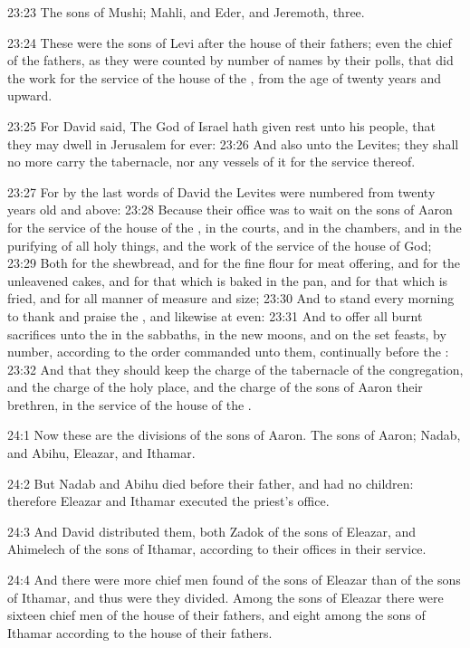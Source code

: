 23:23 The sons of Mushi; Mahli, and Eder, and Jeremoth, three.

23:24 These were the sons of Levi after the house of their fathers; even the chief of the fathers, as they were counted by number of names by their polls, that did the work for the service of the house of the \LORD, from the age of twenty years and upward.

23:25 For David said, The \LORD God of Israel hath given rest unto his people, that they may dwell in Jerusalem for ever: 23:26 And also unto the Levites; they shall no more carry the tabernacle, nor any vessels of it for the service thereof.

23:27 For by the last words of David the Levites were numbered from twenty years old and above: 23:28 Because their office was to wait on the sons of Aaron for the service of the house of the \LORD, in the courts, and in the chambers, and in the purifying of all holy things, and the work of the service of the house of God; 23:29 Both for the shewbread, and for the fine flour for meat offering, and for the unleavened cakes, and for that which is baked in the pan, and for that which is fried, and for all manner of measure and size; 23:30 And to stand every morning to thank and praise the \LORD, and likewise at even: 23:31 And to offer all burnt sacrifices unto the \LORD in the sabbaths, in the new moons, and on the set feasts, by number, according to the order commanded unto them, continually before the \LORD: 23:32 And that they should keep the charge of the tabernacle of the congregation, and the charge of the holy place, and the charge of the sons of Aaron their brethren, in the service of the house of the \LORD.

24:1 Now these are the divisions of the sons of Aaron. The sons of Aaron; Nadab, and Abihu, Eleazar, and Ithamar.

24:2 But Nadab and Abihu died before their father, and had no children: therefore Eleazar and Ithamar executed the priest's office.

24:3 And David distributed them, both Zadok of the sons of Eleazar, and Ahimelech of the sons of Ithamar, according to their offices in their service.

24:4 And there were more chief men found of the sons of Eleazar than of the sons of Ithamar, and thus were they divided. Among the sons of Eleazar there were sixteen chief men of the house of their fathers, and eight among the sons of Ithamar according to the house of their fathers.

